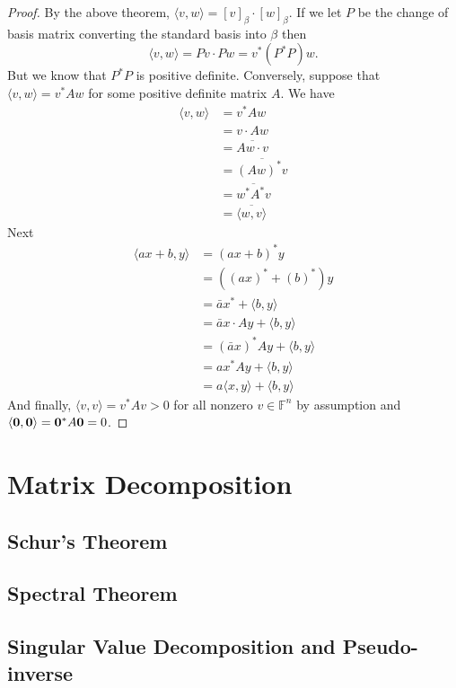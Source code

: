 \documentclass[oneside, 12pt]{book}
\theoremstyle{definition}
\begin{document}
\begin{proof}
  By the above theorem, $\langle v , w \rangle= [v]_{\beta} \cdot [w]_{\beta}$. If we let $P$ be the change of basis matrix converting the standard basis into $\beta$ then \[\langle v , w\rangle = Pv \cdot Pw=v^{*}(P^{*}P)w.\] But we know that $P^{*}P$ is positive definite.
  Conversely, suppose that $\langle v, w \rangle = v^{*}Aw$ for some positive definite matrix $A$. We have
  \begin{align}
    \langle v , w \rangle &= v^{*}Aw \\
              &= v \cdot Aw \\
              &= \overline{Aw \cdot v} \\
              &= \overline{(Aw)^{*}v} \\
              &= \overline{w^{*}A^{*}v} \\
              &= \overline{\langle w , v \rangle}
  \end{align}
  Next
  \begin{align}
    \langle ax+b, y \rangle &= (ax+b)^{*}y \\
                &= ((ax)^{*}+ (b)^{*})y \\
                &= \bar{a}x^{*} + \langle b , y \rangle \\
                &= \bar{a}x \cdot Ay + \langle b , y \rangle \\
                &= (\bar{a}x)^{*}Ay + \langle b , y \rangle \\
                &= ax^{*}Ay + \langle b , y \rangle \\
                &=a \langle x, y \rangle + \langle b , y \rangle
  \end{align}
And finally, $\langle v , v \rangle=v^{*}Av>0$ for all nonzero $v \in \mathbb{F}^{n}$ by assumption and $\langle \bold{0}, \bold{0} \rangle=\bold{0}^{*}A\bold{0}=0$.
\end{proof}
\chapter{Matrix Decomposition}
\section{Schur's Theorem}
\section{Spectral Theorem}
\section{Singular Value Decomposition and Pseudo-inverse}
\end{document}
